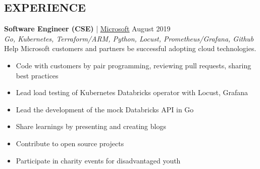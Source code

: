\documentclass[margin, 10pt, hidelinks]{res} %
\newcommand{\emphasize}{\bf} %
\begin{document}
\begin{resume}






    \section{EXPERIENCE}

     {\emphasize Software Engineer (CSE)} | \href{https://www.microsoft.com/}{\underline{Microsoft}}    \hfill August 2019  \\
    {\it Go, Kubernetes, Terraform/ARM, Python, Locust, Prometheus/Grafana, Github} \\ %
    Help Microsoft customers and partners be successful adopting cloud technologies.
    \begin{itemize} \setlength{\itemindent}{-0.1in}\itemsep 0pt %
        \item Code with customers by pair programming, reviewing pull requests, sharing best practices
        \item Lead load testing of Kubernetes Databricks operator with Locust, Grafana
        \item Lead the development of the mock Databricks API in Go
        \item Share learnings by presenting and creating blogs
        \item Contribute to open source projects
        \item Participate in charity events for disadvantaged youth
    \end{itemize}


\end{resume}
\end{document}
